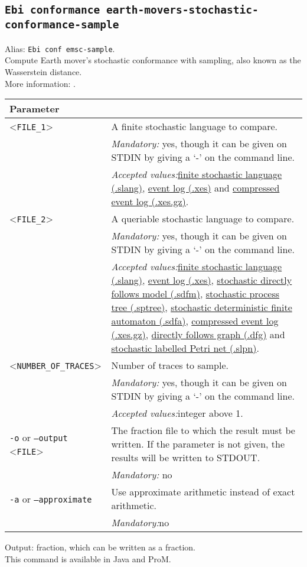 {\subsection{\texttt{Ebi conformance earth-movers-stochastic-conformance-sample}}
\label{command:Ebi conformance earth-movers-stochastic-conformance-sample}
Alias: \texttt{Ebi conf emsc-sample}.\\
Compute Earth mover's stochastic conformance with sampling, also known as the Wasserstein distance.\\
More information: \cite{DBLP:journals/is/LeemansABP21}.\\
\begin{tabularx}{\linewidth}{lX}
\toprule
Parameter \\\midrule
<\texttt{FILE\_1}>&A finite stochastic language to compare.\\
&\textit{Mandatory:} \quad yes, though it can be given on STDIN by giving a `-' on the command line.\\
&\textit{Accepted values:}\quad \hyperref[filehandler:finite stochastic language]{finite stochastic language (.slang)}, \hyperref[filehandler:event log]{event log (.xes)} and \hyperref[filehandler:compressed event log]{compressed event log (.xes.gz)}.\\
<\texttt{FILE\_2}>&A queriable stochastic language to compare.\\
&\textit{Mandatory:} \quad yes, though it can be given on STDIN by giving a `-' on the command line.\\
&\textit{Accepted values:}\quad \hyperref[filehandler:finite stochastic language]{finite stochastic language (.slang)}, \hyperref[filehandler:event log]{event log (.xes)}, \hyperref[filehandler:stochastic directly follows model]{stochastic directly follows model (.sdfm)}, \hyperref[filehandler:stochastic process tree]{stochastic process tree (.sptree)}, \hyperref[filehandler:stochastic deterministic finite automaton]{stochastic deterministic finite automaton (.sdfa)}, \hyperref[filehandler:compressed event log]{compressed event log (.xes.gz)}, \hyperref[filehandler:directly follows graph]{directly follows graph (.dfg)} and \hyperref[filehandler:stochastic labelled Petri net]{stochastic labelled Petri net (.slpn)}.\\
<\texttt{NUMBER\_OF\_TRACES}>&Number of traces to sample.\\
&\textit{Mandatory:} \quad yes, though it can be given on STDIN by giving a `-' on the command line.\\
&\textit{Accepted values:}\quad integer above 1.\\
\texttt{-o} or \texttt{--output} <\texttt{FILE}> &
The fraction file to which the result must be written. If the parameter is not given, the results will be written to STDOUT.\\
&\textit{Mandatory:} \quad no\\
\texttt{-a} or \texttt{--approximate} & Use approximate arithmetic instead of exact arithmetic.\\
&\textit{Mandatory:}\quad no\\
\bottomrule
\end{tabularx}
\noindent Output: fraction, which can be written as a fraction.
\\This command is available in Java and ProM.
}

